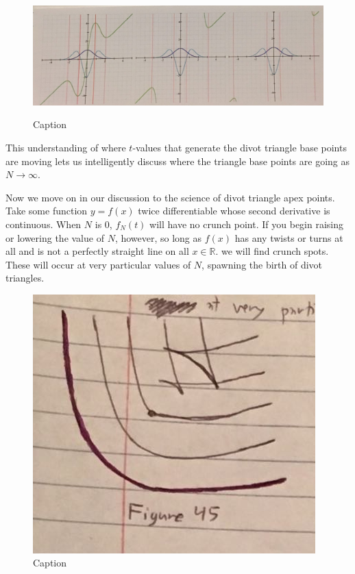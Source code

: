 \renewcommand\w{0.9\textwidth}
\renewcommand\fw{0.9\linewidth}
\renewcommand\fh{.25\textheight}

\begin{figure}[H]
  \centering
  \begin{minipage}[b]{\w}
    \label{divot:5}
    \includegraphics[width=\fw, height=\fh, keepaspectratio]{img/12-divot/05.png}
    \caption{Caption}
  \end{minipage}
\end{figure}

This understanding of where $t$-values that generate the divot triangle base points are moving lets us intelligently discuss where the triangle base points are going as $N \xrightarrow{} \infty$.

Now we move on in our discussion to the science of divot triangle apex points. Take some function $y = f(x)$ twice differentiable whose second derivative is continuous.  When $N$ is 0, $f_N(t)$ will have no crunch point. If you begin raising or lowering the value of $N$, however, so long as $f(x)$ has any twists or turns at all and is not a perfectly straight line on all $x \in \mathbb{R}$. we will find crunch spots. These will occur at very particular values of $N$, spawning the birth of divot triangles.

\renewcommand\w{0.25\textwidth}
\renewcommand\fw{0.9\linewidth}

\begin{figure}
  \includegraphics[width=\fw]{img/12-divot/06.png}
  \caption{Caption}
  \label{divot:6}
\end{figure}

